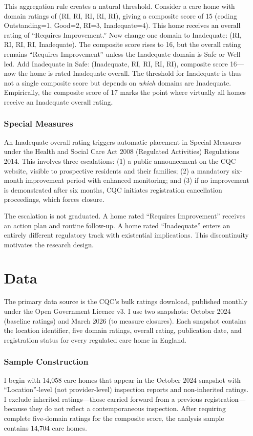 \documentclass[12pt]{article}
\begin{document}
This aggregation rule creates a natural threshold. Consider a care home with domain ratings of (RI, RI, RI, RI, RI), giving a composite score of 15 (coding Outstanding=1, Good=2, RI=3, Inadequate=4). This home receives an overall rating of ``Requires Improvement.'' Now change one domain to Inadequate: (RI, RI, RI, RI, Inadequate). The composite score rises to 16, but the overall rating remains ``Requires Improvement'' unless the Inadequate domain is Safe or Well-led. Add Inadequate in Safe: (Inadequate, RI, RI, RI, RI), composite score 16---now the home is rated Inadequate overall. The threshold for Inadequate is thus not a single composite score but depends on \emph{which} domains are Inadequate. Empirically, the composite score of 17 marks the point where virtually all homes receive an Inadequate overall rating.

\subsubsection*{Special Measures} An Inadequate overall rating triggers automatic placement in Special Measures under the Health and Social Care Act 2008 (Regulated Activities) Regulations 2014. This involves three escalations: (1) a public announcement on the CQC website, visible to prospective residents and their families; (2) a mandatory six-month improvement period with enhanced monitoring; and (3) if no improvement is demonstrated after six months, CQC initiates registration cancellation proceedings, which forces closure.

The escalation is not graduated. A home rated ``Requires Improvement'' receives an action plan and routine follow-up. A home rated ``Inadequate'' enters an entirely different regulatory track with existential implications. This discontinuity motivates the research design.

\section{Data}

The primary data source is the CQC's bulk ratings download, published monthly under the Open Government Licence v3. I use two snapshots: October 2024 (baseline ratings) and March 2026 (to measure closures). Each snapshot contains the location identifier, five domain ratings, overall rating, publication date, and registration status for every regulated care home in England.

\subsubsection*{Sample Construction} I begin with 14,058 care homes that appear in the October 2024 snapshot with ``Location''-level (not provider-level) inspection reports and non-inherited ratings. I exclude inherited ratings---those carried forward from a previous registration---because they do not reflect a contemporaneous inspection. After requiring complete five-domain ratings for the composite score, the analysis sample contains 14,704 care homes.
\end{document}
